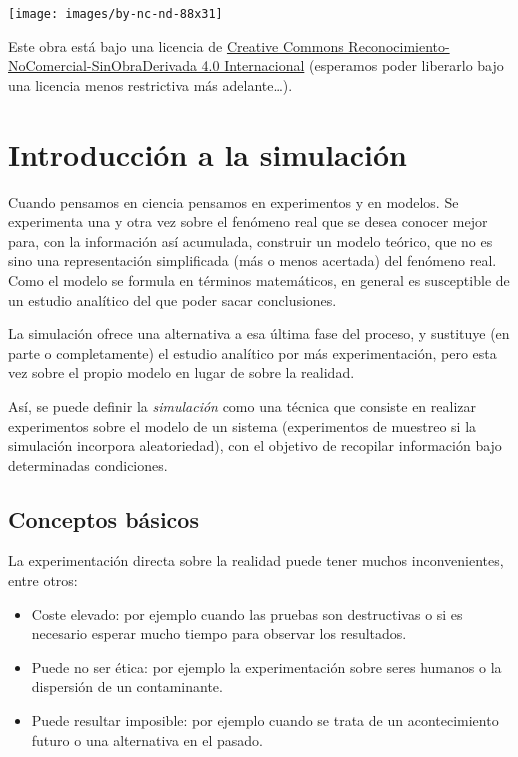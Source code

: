 \documentclass[
  10pt,
]{book}
\theoremstyle{break}
\theoremstyle{nonumberplain}
\begin{document}
\begin{flushleft}\texttt{[image: images/by-nc-nd-88x31]} \end{flushleft}

Este obra está bajo una licencia de \href{https://creativecommons.org/licenses/by-nc-nd/4.0/deed.es_ES}{Creative Commons Reconocimiento-NoComercial-SinObraDerivada 4.0 Internacional}
(esperamos poder liberarlo bajo una licencia menos restrictiva más adelante\ldots).

\hypertarget{intro}{%
\chapter{Introducción a la simulación}\label{intro}}

Cuando pensamos en ciencia pensamos en experimentos y en modelos.
Se experimenta una y otra vez sobre el fenómeno real que se desea conocer mejor para, con la información así acumulada, construir un modelo teórico, que no es sino una representación simplificada (más o menos acertada) del fenómeno real.
Como el modelo se formula en términos matemáticos, en general es susceptible de un estudio analítico del que poder sacar conclusiones.

La simulación ofrece una alternativa a esa última fase del proceso, y sustituye (en parte o completamente) el estudio analítico por más experimentación, pero esta vez sobre el propio modelo en lugar de sobre la realidad.

Así, se puede definir la \emph{simulación} como una técnica que consiste en realizar experimentos sobre el modelo de un sistema (experimentos de muestreo si la simulación incorpora aleatoriedad), con el objetivo de recopilar información bajo determinadas condiciones.

\hypertarget{conceptos}{%
\section{Conceptos básicos}\label{conceptos}}

La experimentación directa sobre la realidad puede tener muchos inconvenientes, entre otros:

\begin{itemize}
\item
  Coste elevado: por ejemplo cuando las pruebas son destructivas o si es necesario esperar mucho tiempo para observar los resultados.
\item
  Puede no ser ética: por ejemplo la experimentación sobre seres humanos o la dispersión de un contaminante.
\item
  Puede resultar imposible: por ejemplo cuando se trata de un acontecimiento futuro o una alternativa en el pasado.
\end{itemize}
\end{document}
